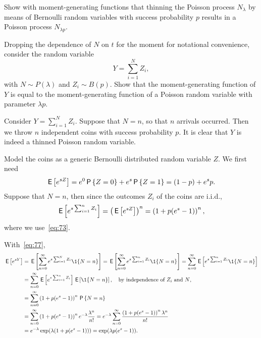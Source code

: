 \begin{exercise}\label{ex:1}
 Show with moment-generating functions that thinning the Poisson process $N_\lambda$ by means of Bernoulli random variables with success probability $p$ results in a Poisson process $N_{\lambda p}$.
\begin{hint}
Dropping the dependence of $N$ on $t$ for the moment for notational convenience, consider the random variable
 \begin{equation*}
 Y = \sum_{i=1}^N Z_i,
 \end{equation*}
 with $N\sim P(\lambda)$ and $Z_i\sim B(p)$. Show that the moment-generating function of $Y$ is equal to the moment-generating
 function of a Poisson random variable with parameter $\lambda p$.
\end{hint}
\begin{solution}
Consider $Y=\sum_{i=1}^N Z_i$. Suppose that $N=n$, so that $n$
arrivals occurred. Then we throw $n$ independent coins with success probability
$p$. It is clear that $Y$ is indeed a thinned Poisson random variable.

Model the coins as a generic Bernoulli distributed random variable
$Z$. We first need
\begin{equation*}
 \,\mathsf{E}\left[e^{s Z}\right] = e^0 \,\mathsf{P}\left\{Z=0\right\} + e^{s} \,\mathsf{P}\left\{Z=1\right\} = (1-p) + e^s p.
\end{equation*}
Suppose that $N=n$, then since the outcomes $Z_i$ of the coins are i.i.d.,
\begin{equation*}
\,\mathsf{E}\left[e^{s\sum_{i=1}^n Z_i}\right] = \left(\,\mathsf{E}\left[e^{s Z}\right]\right)^n = \left(1 + p (e^s - 1)\right)^n,
\end{equation*}
where we use~\cref{eq:73}.

With~\cref{eq:77},
\begin{align*}
 \E{e^{s Y}}
&= \E{\sum_{n=0}^\infty e^{s\sum_{i=1}^N Z_i} \1{N=n}}
= \E{\sum_{n=0}^\infty e^{s\sum_{i=1}^n Z_i} \1{N=n}}
= \sum_{n=0}^\infty \E{e^{s\sum_{i=1}^n Z_i} \1{N=n}} \\
&= \sum_{n=0}^\infty \E{e^{s\sum_{i=1}^n Z_i}} \E{\1{N=n}},\quad\text{by independence of $Z_i$ and $N$}, \\
&= \sum_{n=0}^\infty \left(1+p(e^s-1)\right)^n \P{N=n} \\
&= \sum_{n=0}^\infty \left(1+p(e^s-1)\right)^n e^{-\lambda} \frac{\lambda^n}{n!}
= e^{-\lambda} \sum_{n=0}^\infty \frac{\left(1+p(e^s-1)\right)^n \lambda^n}{n!}\\
&= e^{-\lambda} \exp(\lambda (1+p(e^s-1))) = \exp(\lambda p (e^s - 1)).
\end{align*}
\end{solution}
\end{exercise}



